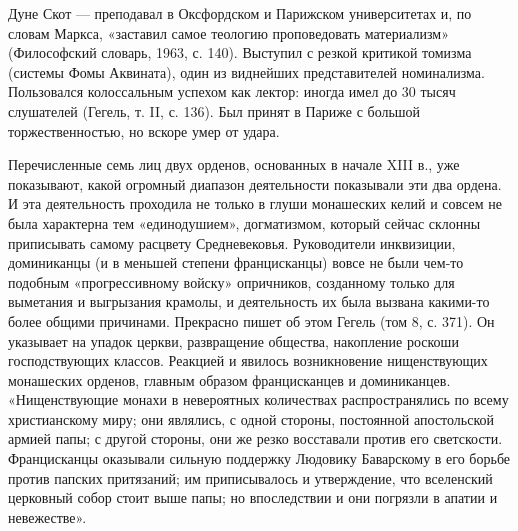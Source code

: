 Дуне Скот --- преподавал в Оксфордском и Парижском университетах и, по
словам  Маркса, «заставил  самое  теологию проповедовать  материализм»
(Философский  словарь,  1963,  с.  140). Выступил  с  резкой  критикой
томизма  (системы Фомы  Аквината),  один  из виднейших  представителей
номинализма. Пользовался колоссальным успехом  как лектор: иногда имел
до 30 тысяч слушателей (Гегель, т. II,  с. 136). Был принят в Париже с
большой торжественностью, но вскоре умер от удара.

Перечисленные  семь лиц  двух орденов,  основанных в  начале XIII  в.,
уже  показывают,  какой   огромный  диапазон  деятельности  показывали
эти  два  ордена. И  эта  деятельность  проходила  не только  в  глуши
монашеских  келий  и  совсем  не была  характерна  тем  «единодушием»,
догматизмом,  который  сейчас   склонны  приписывать  самому  расцвету
Средневековья.  Руководители  инквизиции,  доминиканцы  (и  в  меньшей
степени францисканцы)  вовсе не  были чем-то  подобным «прогрессивному
войску»  опричников,  созданному  только для  выметания  и  выгрызания
крамолы,  и  деятельность  их  была  вызвана  какими-то  более  общими
причинами.  Прекрасно  пишет  об  этом  Гегель (том  8,  с.  371).  Он
указывает на  упадок церкви, развращение общества,  накопление роскоши
господствующих классов. Реакцией и явилось возникновение нищенствующих
монашеских  орденов,  главным  образом францисканцев  и  доминиканцев.
«Нищенствующие  монахи в  невероятных количествах  распространялись по
всему христианскому  миру; они  являлись, с одной  стороны, постоянной
апостольской армией  папы; с другой  стороны, они же  резко восставали
против  его  светскости.   Францисканцы  оказывали  сильную  поддержку
Людовику  Баварскому  в  его  борьбе  против  папских  притязаний;  им
приписывалось и утверждение, что вселенский церковный собор стоит выше
папы; но впоследствии и они погрязли в апатии и невежестве».

